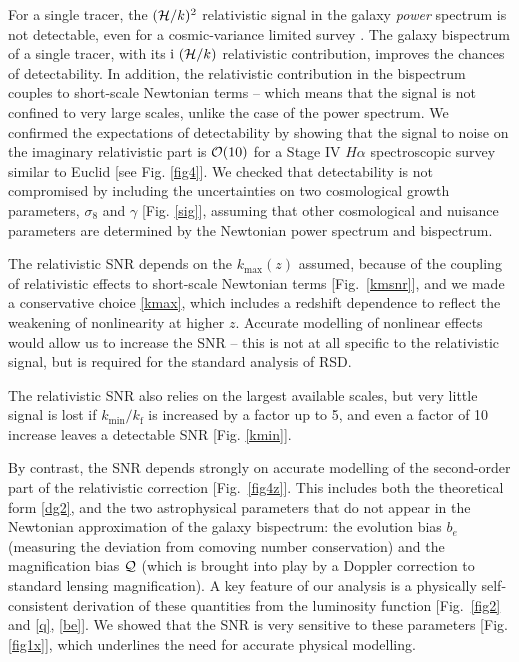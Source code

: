 For a single tracer, the $(\mathcal{H}/k)^{2}$ relativistic signal in the galaxy {\em power} spectrum is not detectable, even for a cosmic-variance limited survey \cite{Alonso:2015uua}.
The galaxy bispectrum of a single tracer, with its ${\mathrm{i\,}}\,(\mathcal{H}/k)$ relativistic contribution, improves the chances of detectability. In addition, the relativistic contribution in the bispectrum couples to short-scale Newtonian terms -- which means that the signal is not confined to very large scales, unlike the case of the power spectrum. We confirmed the expectations of detectability by showing that the signal to noise on the imaginary relativistic part is ${\cal O}(10)$ for a Stage IV $H\alpha$ spectroscopic survey similar to Euclid [see Fig. \ref{fig4}].  We checked that detectability is not compromised by including the uncertainties on two cosmological growth parameters, $\sigma_8$ and $\gamma$ [Fig. \ref{sig}], assuming that other cosmological  and nuisance parameters are determined by the Newtonian power spectrum and bispectrum. 


The relativistic SNR depends on the $k_{\mathrm{max}}(z)$ assumed, because of the coupling of relativistic effects to short-scale Newtonian terms [Fig.~\ref{kmsnr}], and  we made a conservative choice \eqref{kmax}, which includes a redshift dependence to reflect the weakening of nonlinearity at higher $z$. 
Accurate modelling of nonlinear effects would allow us to increase the SNR  
 -- this is not at all specific to the relativistic signal,  but is required for the standard analysis of RSD.

The relativistic SNR also relies  on the largest available scales, but very little signal is lost if $k_{\mathrm{min}}/k_{\mathrm{f}}$ is increased by a factor up  to 5, and even a factor of 10 increase leaves a detectable SNR  [Fig. \ref{kmin}].

By contrast, the SNR depends strongly on accurate modelling of the second-order part of the relativistic correction  [Fig.~\ref{fig4z}]. This includes both the theoretical form \eqref{dg2}, and the
 two astrophysical parameters that do not appear in the Newtonian approximation of the galaxy bispectrum: the evolution bias $b_e$ (measuring the deviation from comoving number conservation) and the magnification bias $\mathcal{Q}$ (which is brought into play by a Doppler correction to standard lensing magnification).  A key feature of our analysis is a physically self-consistent derivation of these quantities from the luminosity function [Fig.~\ref{fig2} and \eqref{q}, \eqref{be}].
We showed that the SNR is very sensitive to these parameters [Fig. \ref{fig1x}], which underlines the need for accurate physical modelling. 

